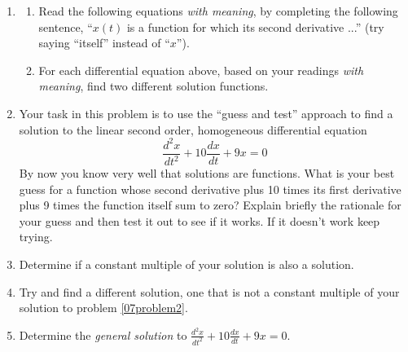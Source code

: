 \begin{enumerate}
\item \label{07problem1}
\begin{enumerate}
\item Read the following equations \textit{with meaning}, by completing the following sentence, ``$x(t)$ is a function for which its second derivative ...'' (try saying ``itself'' instead of ``$x$''). \\


\item For each differential equation above, based on your readings \textit{with meaning}, find two different solution functions. \vfill
\end{enumerate}
\item Your task in this problem is to use the ``guess and test'' approach to find a solution to the linear second order, homogeneous differential equation \label{07problem2}
\[
\frac{d^2x}{dt^2}+10\frac{dx}{dt}+9x=0
\]
By now you know very well that solutions are functions. What is your best guess for a function whose second derivative plus 10 times its first derivative plus 9 times the function itself sum to zero? Explain briefly the rationale for your guess and then test it out to see if it works. If it doesn't work keep trying. \vfill

\item Determine if a constant multiple of your solution is also a solution. \label{07problem3} \vfill

\clearpage

\item Try and find a different solution, one that is not a constant multiple of your solution to problem \ref{07problem2}. \label{07problem4} \vfill

\item Determine the \textit{general solution} to $\displaystyle\frac{d^2x}{dt^2}+10\frac{dx}{dt}+9x=0$. \label{07problem5} \vfill


\end{enumerate}
